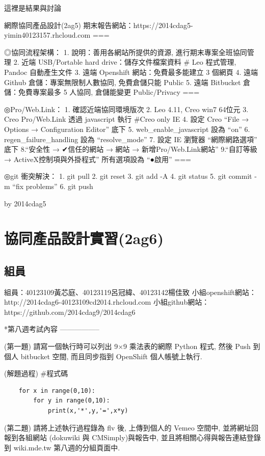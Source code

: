 \documentclass[]{article}
\begin{document}
這裡是結果與討論

網際協同產品設計(2ag5)
期末報告網站：https://2014cdag5-yimin40123157.rhcloud.com ===

◎協同流程架構： 1. 說明：善用各網站所提供的資源,
進行期末專案全班協同管理 2. 近端 USB/Portable hard
drive：儲存文件檔案資料 \# Leo 程式管理, Pandoc 自動產生文件 3. 遠端
Openshift 網站：免費最多能建立 3 個網頁 4. 遠端 Github
倉儲：專案無限制人數協同, 免費倉儲只能 Public 5. 遠端 Bitbucket
倉儲：免費專案最多 5 人協同, 倉儲能變更 Public/Privacy ===

◎Pro/​Web.Link： 1. 確認近端協同環境版次 2. Leo 4.11, Creo win7 64位元
3. Creo Pro/​Web.Link 透過 javascript 執行 \#Creo only IE 4. 設定 Creo
``File → Options → Configuration Editor'' 底下 5.
web\_enable\_javascript 設為 ``on'' 6. regen\_failure\_handling 設為
``resolve\_mode'' 7. 設定 IE 瀏覽器 ``網際網路選項'' 底下 8.``安全性 →
✔信任的網站 → 網站 → 新增Pro/​Web.Link網站'' 9.``自訂等級 →
ActiveX控制項與外掛程式'' 所有選項設為 ``●啟用'' ===

◎git 衝突解決： 1. git pull 2. git reset 3. git add -A 4. git status 5.
git commit -m ``fix problems'' 6. git push

by 2014cdag5

\section{協同產品設計實習(2ag6)}\label{ux5354ux540cux7522ux54c1ux8a2dux8a08ux5be6ux7fd22ag6}

\subsection{組員}\label{ux7d44ux54e1-1}

組員：40123109黃芯庭、40123119呂冠緯、40123142楊佳致
小組openshift網站：http://2014cdag6-40123109cd2014.rhcloud.com
小組github網站：https://github.com/2014cdag9/2014cdag6

*第八週考試內容 -----------------

(第一題) 請寫一個執行時可以列出 9×9 乘法表的網際 Python 程式, 然後 Push
到個人 bitbucket 空間, 而且同步指到 OpenShift 個人帳號上執行.

(解題過程) \#程式碼

\begin{verbatim}
    for x in range(0,10):
        for y in range(0,10):
            print(x,'*',y,'=',x*y)
\end{verbatim}

(第二題) 請將上述執行過程錄為 flv 後, 上傳到個人的 Vemeo 空間中,
並將網址回報到各組網站 (dokuwiki 與 CMSimply)與報告中,
並且將相關心得與報告連結登錄到 wiki.mde.tw 第八週的分組頁面中.
\end{document}
